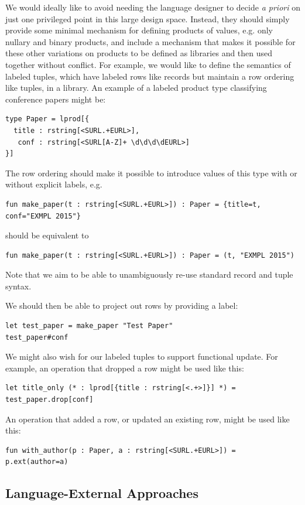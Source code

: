 We would ideally like to avoid needing the language designer to decide \emph{a priori} on just one privileged point in this large design space. Instead, they should simply provide some minimal mechanism for defining products of values, e.g. only nullary and binary products, and include a mechanism that makes it possible for these other variations on products to be defined as libraries and then used together without conflict. For example, we would like to define the semantics of labeled tuples, which have labeled rows like records but maintain a row ordering like tuples, in a library. An example of a labeled product type classifying conference papers might be:
\begin{lstlisting}[numbers=none]
type Paper = lprod[{
  title : rstring[<SURL.+EURL>], 
   conf : rstring[<SURL[A-Z]+ \d\d\d\dEURL>]
}]
\end{lstlisting}

The row ordering should make it possible to introduce values of this type with or without explicit labels, e.g.
\begin{lstlisting}[numbers=none]
fun make_paper(t : rstring[<SURL.+EURL>]) : Paper = {title=t, conf="EXMPL 2015"}
\end{lstlisting}
should be equivalent to
\begin{lstlisting}[numbers=none]
fun make_paper(t : rstring[<SURL.+EURL>]) : Paper = (t, "EXMPL 2015")
\end{lstlisting}
Note that we aim to be able to unambiguously re-use standard record and tuple syntax.

We should then be able to project out rows by providing a label:
\begin{lstlisting}[numbers=none]
let test_paper = make_paper "Test Paper"
test_paper#conf
\end{lstlisting}

We might also wish for our labeled tuples to support functional update. For example, an operation that dropped a row might be used like this:
\begin{lstlisting}[numbers=none]
let title_only (* : lprod[{title : rstring[<.+>]}] *) = test_paper.drop[conf]
\end{lstlisting}
An operation that added a row, or updated an existing row, might be used like this:
\begin{lstlisting}[numbers=none]
fun with_author(p : Paper, a : rstring[<SURL.+EURL>]) = p.ext(author=a)
\end{lstlisting}
\subsection{Language-External Approaches}\label{external-approaches}


